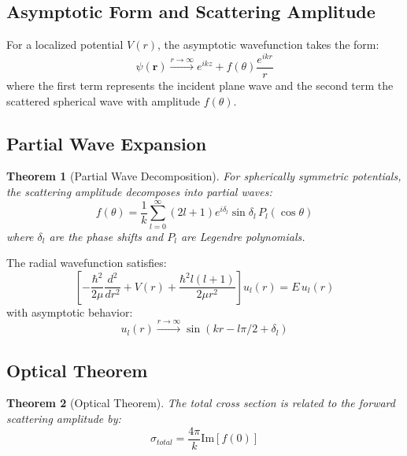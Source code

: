 \documentclass[a4paper, 11pt]{article}
\newtheorem{theorem}{Theorem}[section]
\begin{document}
\subsection{Asymptotic Form and Scattering Amplitude}

For a localized potential $V(r)$, the asymptotic wavefunction takes the form:
\begin{equation}
\psi(\mathbf{r}) \xrightarrow{r \to \infty} e^{i k z} + f(\theta) \frac{e^{i k r}}{r}
\end{equation}
where the first term represents the incident plane wave and the second term the scattered
spherical wave with amplitude $f(\theta)$.

\subsection{Partial Wave Expansion}

\begin{theorem}[Partial Wave Decomposition]
For spherically symmetric potentials, the scattering amplitude decomposes into partial waves:
\begin{equation}
f(\theta) = \frac{1}{k} \sum_{l=0}^\infty (2l+1) e^{i\delta_l} \sin\delta_l \, P_l(\cos\theta)
\end{equation}
where $\delta_l$ are the phase shifts and $P_l$ are Legendre polynomials.
\end{theorem}

The radial wavefunction satisfies:
\begin{equation}
\left[ -\frac{\hbar^2}{2\mu} \frac{d^2}{dr^2} + V(r) + \frac{\hbar^2 l(l+1)}{2\mu r^2} \right] u_l(r) = E \, u_l(r)
\end{equation}
with asymptotic behavior:
\begin{equation}
u_l(r) \xrightarrow{r \to \infty} \sin(kr - l\pi/2 + \delta_l)
\end{equation}

\subsection{Optical Theorem}

\begin{theorem}[Optical Theorem]
The total cross section is related to the forward scattering amplitude by:
\begin{equation}
\sigma_{total} = \frac{4\pi}{k} \text{Im}[f(0)]
\end{equation}
\end{theorem}
\end{document}
